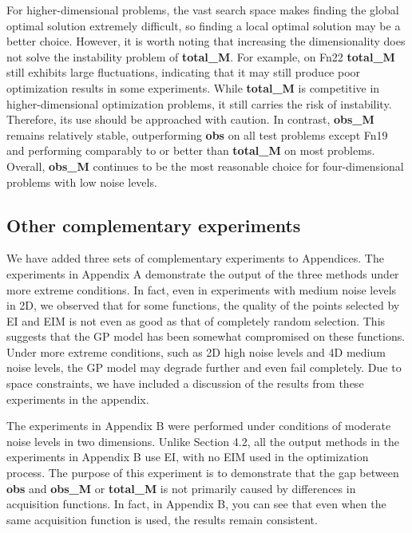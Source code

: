 \documentclass{article}
\begin{document}
\hspace{2em}For higher-dimensional problems, the vast search space makes finding the global optimal solution extremely difficult, so finding a local optimal solution may be a better choice. However, it is worth noting that increasing the dimensionality does not solve the instability problem of \textbf{total\_M}. For example, on Fn22 \textbf{total\_M} still exhibits large fluctuations, indicating that it may still produce poor optimization results in some experiments. While \textbf{total\_M} is competitive in higher-dimensional optimization problems, it still carries the risk of instability. Therefore, its use should be approached with caution. In contrast, \textbf{obs\_M} remains relatively stable, outperforming \textbf{obs} on all test problems except Fn19 and performing comparably to or better than \textbf{total\_M} on most problems. Overall, \textbf{obs\_M} continues to be the most reasonable choice for four-dimensional problems with low noise levels. 

\subsection{Other complementary experiments}
\hspace{2em}We have added three sets of complementary experiments to Appendices. The experiments in Appendix A demonstrate the output of the three methods under more extreme conditions. In fact, even in experiments with medium noise levels in 2D, we observed that for some functions, the quality of the points selected by EI and EIM is not even as good as that of completely random selection. This suggests that the GP model has been somewhat compromised on these functions. Under more extreme conditions, such as 2D high noise levels and 4D medium noise levels, the GP model may degrade further and even fail completely. Due to space constraints, we have included a discussion of the results from these experiments in the appendix.

\hspace{2em}The experiments in Appendix B were performed under conditions of moderate noise levels in two dimensions. Unlike Section 4.2, all the output methods in the experiments in Appendix B use EI, with no EIM used in the optimization process. The purpose of this experiment is to demonstrate that the gap between \textbf{obs} and \textbf{obs\_M} or \textbf{total\_M} is not primarily caused by differences in acquisition functions. In fact, in Appendix B, you can see that even when the same acquisition function is used, the results remain consistent.
\end{document}
